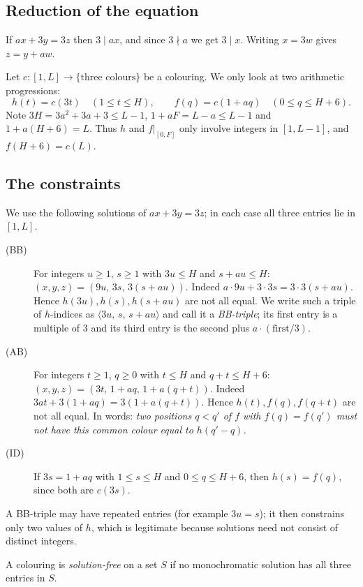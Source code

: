 \documentclass[11pt]{amsart}
\theoremstyle{definition}
\theoremstyle{remark}
\newcommand{\tri}[3]{\langle #1,\,#2,\,#3\rangle}
\begin{document}
\subsection{Reduction of the equation}
If $ax+3y=3z$ then $3\mid ax$, and since $3\nmid a$ we get $3\mid x$. Writing $x=3w$ gives $z=y+aw$.

Let $c\colon[1,L]\to\{\text{three colours}\}$ be a colouring. We only look at two arithmetic progressions:
\[h(t)=c(3t)\quad(1\le t\le H),\qquad f(q)=c(1+aq)\quad(0\le q\le H+6).\]
Note $3H=3a^2+3a+3\le L-1$, $1+aF=L-a\le L-1$ and $1+a(H+6)=L$. Thus $h$ and $f|_{[0,F]}$ only involve integers in
$[1,L-1]$, and $f(H+6)=c(L)$.

\subsection{The constraints}
We use the following solutions of $ax+3y=3z$; in each case all three entries lie in $[1,L]$.

\begin{description}
\item[(BB)] For integers $u\ge1$, $s\ge1$ with $3u\le H$ and $s+au\le H$: $(x,y,z)=(9u,\,3s,\,3(s+au))$. Indeed
$a\cdot9u+3\cdot3s=3\cdot3(s+au)$. Hence $h(3u),h(s),h(s+au)$ are not all equal. We write such a triple of
$h$-indices as $\tri{3u}{s}{s+au}$ and call it a \emph{BB-triple}; its first entry is a multiple of $3$ and its third
entry is the second plus $a\cdot(\text{first}/3)$.
\item[(AB)] For integers $t\ge1$, $q\ge0$ with $t\le H$ and $q+t\le H+6$: $(x,y,z)=(3t,\,1+aq,\,1+a(q+t))$. Indeed
$3at+3(1+aq)=3(1+a(q+t))$. Hence $h(t),f(q),f(q+t)$ are not all equal. In words: \emph{two positions $q<q'$ of $f$
with $f(q)=f(q')$ must not have this common colour equal to $h(q'-q)$.}
\item[(ID)] If $3s=1+aq$ with $1\le s\le H$ and $0\le q\le H+6$, then $h(s)=f(q)$, since both are $c(3s)$.
\end{description}

A BB-triple may have repeated entries (for example $3u=s$); it then constrains only two values of $h$, which is
legitimate because solutions need not consist of distinct integers.

A colouring is \emph{solution-free} on a set $S$ if no monochromatic solution has all three entries in $S$.
\end{document}
